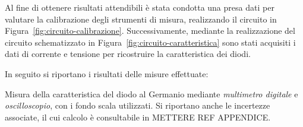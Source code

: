 \documentclass[@MAIN@]{subfiles}
\begin{document}
    Al fine di ottenere risultati attendibili è stata condotta una presa dati per valutare la
    calibrazione degli strumenti di misura, realizzando il circuito in Figura~\ref{fig:circuito-calibrazione}. Successivamente,
    mediante la realizzazione del circuito schematizzato in Figura~\ref{fig:circuito-caratteristica}
    sono stati acquisiti i dati di corrente e tensione per ricostruire la caratteristica dei diodi.\newline

    \noindent In seguito si riportano i risultati delle misure effettuate:\newline
    \vspace{1.5pt}
%
%            
%            
%
%
%
    \begin{table}[ht]
        \centering
        
        \captionsetup{justification=centering} %
        \caption{Misura della caratteristica del diodo al Germanio mediante \textit{multimetro digitale} e
        \textit{oscilloscopio}, con i fondo scala utilizzati. Si riportano anche le incertezze associate,
            il cui calcolo è consultabile in METTERE REF APPENDICE.}
        \label{tab:germanio}
    \end{table}
\end{document}
